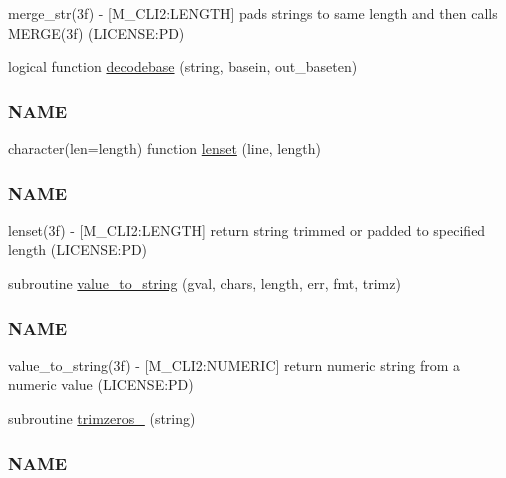 \begin{DoxyCompactItemize}
\begin{DoxyCompactList}
merge\+\_\+str(3f) -\/ \mbox{[}M\+\_\+\+C\+L\+I2\+:L\+E\+N\+G\+TH\mbox{]} pads strings to same length and then calls M\+E\+R\+G\+E(3f) (L\+I\+C\+E\+N\+SE\+:PD) \end{DoxyCompactList}\item 
logical function \mbox{\hyperlink{namespacem__cli2_a1029304d495b2bf791e03cfab5983bbb}{decodebase}} (string, basein, out\+\_\+baseten)
\begin{DoxyCompactList}\small\item\em \subsubsection*{N\+A\+ME}\end{DoxyCompactList}\item 
character(len=length) function \mbox{\hyperlink{namespacem__cli2_ad13853611abfee00d40ffa020662ec8a}{lenset}} (line, length)
\begin{DoxyCompactList}\small\item\em \subsubsection*{N\+A\+ME}

lenset(3f) -\/ \mbox{[}M\+\_\+\+C\+L\+I2\+:L\+E\+N\+G\+TH\mbox{]} return string trimmed or padded to specified length (L\+I\+C\+E\+N\+SE\+:PD) \end{DoxyCompactList}\item 
subroutine \mbox{\hyperlink{namespacem__cli2_a1bbcefd886dabb0286e2cb14ab54034f}{value\+\_\+to\+\_\+string}} (gval, chars, length, err, fmt, trimz)
\begin{DoxyCompactList}\small\item\em \subsubsection*{N\+A\+ME}

value\+\_\+to\+\_\+string(3f) -\/ \mbox{[}M\+\_\+\+C\+L\+I2\+:N\+U\+M\+E\+R\+IC\mbox{]} return numeric string from a numeric value (L\+I\+C\+E\+N\+SE\+:PD) \end{DoxyCompactList}\item 
subroutine \mbox{\hyperlink{namespacem__cli2_a770a66475094fd80493d46498de1ebf7}{trimzeros\+\_\+}} (string)
\begin{DoxyCompactList}\small\item\em \subsubsection*{N\+A\+ME}


\end{DoxyCompactList}
\end{DoxyCompactItemize}
